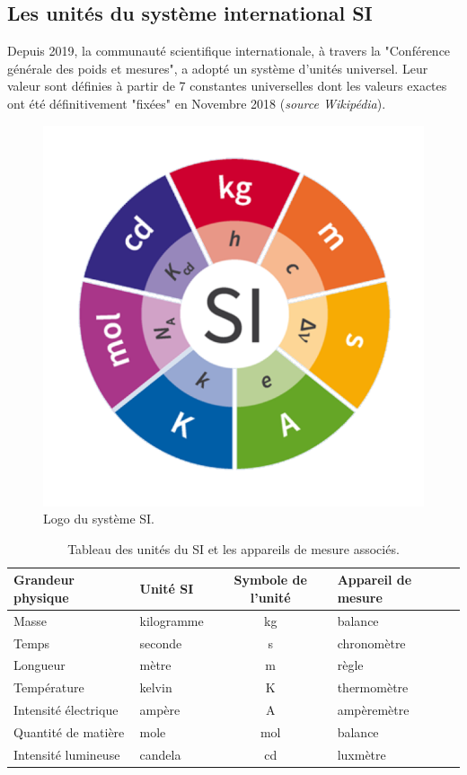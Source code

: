 \subsection{Les unités du système international SI}
Depuis 2019, la communauté scientifique internationale, à travers la "Conférence générale des poids et mesures", a adopté un système d'unités universel. Leur valeur sont définies à partir de 7 constantes universelles dont les valeurs exactes ont été définitivement "fixées" en Novembre 2018 (\textit{source Wikipédia}). 
\begin{figure}[!h]
    \centering\includegraphics[scale=0.4]{Images/Methodo/Fiche_Methode1/SI_Logo_with_defining_constants.png}
    \caption{Logo du système SI. }
    \label{fig:Syteme_SI}
\end{figure}
\begin{table}[!h]
    \centering
    \begin{tabularx}{\textwidth}{| X | X | c | X |}  \hline
Grandeur physique & Unité SI & Symbole de l'unité & Appareil de mesure \\
\hline
Masse & kilogramme & kg & balance \\
Temps & seconde & s & chronomètre \\
Longueur & mètre & m & règle \\
Température & kelvin & K & thermomètre \\
Intensité électrique & ampère & A & ampèremètre \\
Quantité de matière & mole & mol & balance\\
Intensité lumineuse & candela & cd & luxmètre \\
\hline
\end{tabularx}
    \caption{Tableau des unités du SI et les appareils de mesure associés.}
    \label{tab:SI}
\end{table}
